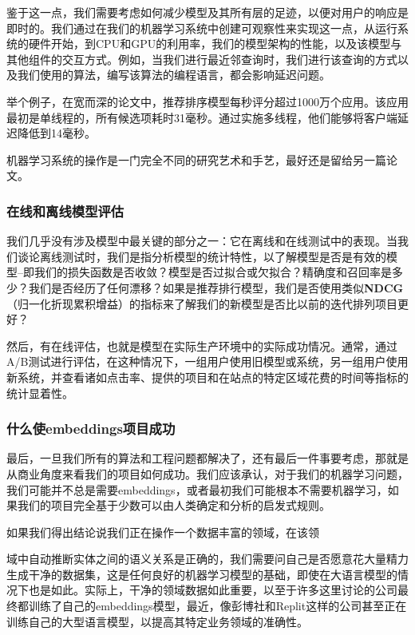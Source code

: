 \documentclass[Chinese, 11pt, table]{diazessay} %
\begin{document}
\begin{CJK}{UTF8}{gbsn}
\begin{sloppypar}
鉴于这一点，我们需要考虑如何减少模型及其所有层的足迹，以便对用户的响应是即时的。我们通过在我们的机器学习系统中创建可观察性来实现这一点，从运行系统的硬件开始，到CPU和GPU的利用率，我们的模型架构的性能，以及该模型与其他组件的交互方式。例如，当我们进行最近邻查询时，我们进行该查询的方式以及我们使用的算法，编写该算法的编程语言，都会影响延迟问题。

举个例子，在宽而深的论文中，推荐排序模型每秒评分超过1000万个应用。该应用最初是单线程的，所有候选项耗时31毫秒。通过实施多线程，他们能够将客户端延迟降低到14毫秒\citep{cheng2016wide}。

机器学习系统的操作是一门完全不同的研究艺术和手艺，最好还是留给另一篇论文\citep{kreuzberger2022machine}。

\subsubsection{在线和离线模型评估}
我们几乎没有涉及模型中最关键的部分之一：它在离线和在线测试中的表现。当我们谈论离线测试时，我们是指分析模型的统计特性，以了解模型是否是有效的模型--即我们的损失函数是否收敛？模型是否过拟合或欠拟合？精确度和召回率是多少？我们是否经历了任何漂移？如果是推荐排行模型，我们是否使用类似\textbf{NDCG}（归一化折现累积增益）的指标来了解我们的新模型是否比以前的迭代排列项目更好？

然后，有在线评估，也就是模型在实际生产环境中的实际成功情况。通常，通过A/B测试进行评估，在这种情况下，一组用户使用旧模型或系统，另一组用户使用新系统，并查看诸如点击率、提供的项目和在站点的特定区域花费的时间等指标的统计显着性。

\subsubsection{什么使embeddings项目成功}
最后，一旦我们所有的算法和工程问题都解决了，还有最后一件事要考虑，那就是从商业角度来看我们的项目如何成功。我们应该承认，对于我们的机器学习问题，我们可能并不总是需要embeddings，或者最初我们可能根本不需要机器学习，如果我们的项目完全基于少数可以由人类确定和分析的启发式规则\citep{zinkevich2017rules}。

如果我们得出结论说我们正在操作一个数据丰富的领域，在该领

域中自动推断实体之间的语义关系是正确的，我们需要问自己是否愿意花大量精力生成干净的数据集，这是任何良好的机器学习模型的基础，即使在大语言模型的情况下也是如此。实际上，干净的领域数据如此重要，以至于许多这里讨论的公司最终都训练了自己的embeddings模型，最近，像彭博社\citep{wu2023bloomberggpt}和Replit\citep{Shabani_2023}这样的公司甚至正在训练自己的大型语言模型，以提高其特定业务领域的准确性。


\end{sloppypar}
\end{CJK}
\end{document}

